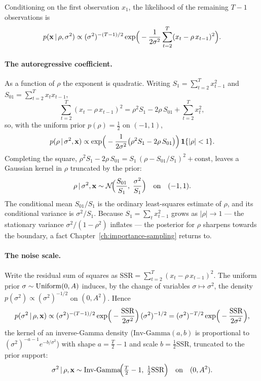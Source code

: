 Conditioning on the first observation $x_1$, the likelihood of the
remaining $T-1$ observations is
%
\begin{equation}
  p(\mathbf{x} \,|\, \rho, \sigma^2)
  \propto (\sigma^2)^{-(T-1)/2}
  \exp\!\Big(-\frac{1}{2\sigma^2}
  \sum_{t=2}^{T}(x_t - \rho\,x_{t-1})^2\Big).
\end{equation}

\paragraph{The autoregressive coefficient.}
As a function of $\rho$ the exponent is quadratic. Writing
$S_1 = \sum_{t=2}^{T} x_{t-1}^2$ and
$S_{01} = \sum_{t=2}^{T} x_t x_{t-1}$,
%
\begin{equation}
  \sum_{t=2}^{T}(x_t - \rho\,x_{t-1})^2
  = \rho^2 S_1 - 2\rho\,S_{01} + \sum_{t=2}^{T} x_t^2,
\end{equation}
%
so, with the uniform prior $p(\rho) = \tfrac{1}{2}$ on $(-1, 1)$,
%
\begin{equation}
  p(\rho \,|\, \sigma^2, \mathbf{x})
  \propto \exp\!\Big(-\frac{1}{2\sigma^2}
  \big(\rho^2 S_1 - 2\rho\,S_{01}\big)\Big)\,
  \mathbf{1}\{|\rho| < 1\}.
\end{equation}
%
Completing the square,
$\rho^2 S_1 - 2\rho\,S_{01}
= S_1\,(\rho - S_{01}/S_1)^2 + \text{const}$, leaves a Gaussian kernel
in $\rho$ truncated by the prior:
%
\begin{equation}
  \rho \,|\, \sigma^2, \mathbf{x}
  \sim \mathcal{N}\!\Big(\frac{S_{01}}{S_1},\;
  \frac{\sigma^2}{S_1}\Big)
  \quad\text{on}\quad (-1, 1).
\end{equation}
%
The conditional mean $S_{01}/S_1$ is the ordinary least-squares
estimate of $\rho$, and its conditional variance is $\sigma^2/S_1$.
Because $S_1 = \sum_{t} x_{t-1}^2$ grows as $|\rho| \to 1$ --- the
stationary variance $\sigma^2/(1-\rho^2)$ inflates --- the posterior
for $\rho$ sharpens towards the boundary, a fact
Chapter~\ref{ch:importance-sampling} returns to.

\paragraph{The noise scale.}
Write the residual sum of squares as
$\text{SSR} = \sum_{t=2}^{T}(x_t - \rho\,x_{t-1})^2$. The uniform
prior $\sigma \sim \mathrm{Uniform}(0, A)$ induces, by the change of variables
$\sigma \mapsto \sigma^2$, the density
$p(\sigma^2) \propto (\sigma^2)^{-1/2}$ on $(0, A^2)$. Hence
%
\begin{equation}
  p(\sigma^2 \,|\, \rho, \mathbf{x})
  \propto (\sigma^2)^{-(T-1)/2}
  \exp\!\Big(-\frac{\text{SSR}}{2\sigma^2}\Big)\,
  (\sigma^2)^{-1/2}
  = (\sigma^2)^{-T/2}
  \exp\!\Big(-\frac{\text{SSR}}{2\sigma^2}\Big),
\end{equation}
%
the kernel of an inverse-Gamma density
($\text{Inv-Gamma}(a, b)$ is proportional to
$(\sigma^2)^{-a-1}e^{-b/\sigma^2}$) with shape
$a = \tfrac{T}{2} - 1$ and scale $b = \tfrac{1}{2}\text{SSR}$,
truncated to the prior support:
%
\begin{equation}
  \sigma^2 \,|\, \rho, \mathbf{x}
  \sim \text{Inv-Gamma}\!\Big(\tfrac{T}{2} - 1,\;
  \tfrac{1}{2}\text{SSR}\Big)
  \quad\text{on}\quad (0, A^2).
\end{equation}
%
